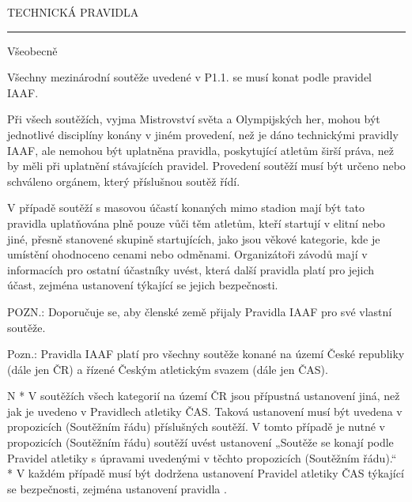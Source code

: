 \chap TECHNICKÁ PRAVIDLA

\rule{99}
\secc Všeobecně

Všechny mezinárodní soutěže uvedené v P1.1. se musí konat podle pravidel IAAF.

Při všech soutěžích, vyjma Mistrovství světa a Olympijských her, mohou být jednotlivé disciplíny konány v jiném provedení, než je dáno technickými pravidly IAAF, ale nemohou být uplatněna pravidla, poskytující atletům širší práva, než by měli při uplatnění stávajících pravidel.
Provedení soutěží musí být určeno nebo schváleno orgánem, který příslušnou soutěž řídí.

V případě soutěží s masovou účastí konaných mimo stadion mají být tato pravidla uplatňována plně pouze vůči těm atletům, kteří startují v elitní nebo jiné, přesně stanovené skupině startujících, jako jsou věkové kategorie, kde je umístění ohodnoceno cenami nebo odměnami.
Organizátoři závodů mají v informacích pro ostatní účastníky uvést, která další pravidla platí pro jejich účast, zejména ustanovení týkající se jejich bezpečnosti.

POZN.: Doporučuje se, aby členské země přijaly Pravidla IAAF pro své vlastní soutěže.

Pozn.: Pravidla IAAF platí pro všechny soutěže konané na území České republiky (dále jen ČR) a řízené Českým atletickým svazem (dále jen ČAS).

\begitems \style N 
* V soutěžích všech kategorií na území ČR jsou přípustná ustanovení jiná, než jak je uvedeno v Pravidlech atletiky ČAS. Taková ustanovení musí být uvedena v propozicích (Soutěžním řádu) příslušných soutěží. V tomto případě je nutné v propozicích (Soutěžním řádu) soutěží uvést ustanovení „Soutěže se konají podle Pravidel atletiky s úpravami uvedenými v těchto propozicích (Soutěžním řádu).“
* V každém případě musí být dodržena ustanovení Pravidel atletiky ČAS týkající se bezpečnosti, zejména ustanovení pravidla .
\enditems





















\endinput